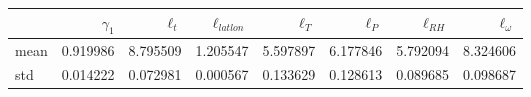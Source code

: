 \begin{tabular}{lrrrrrrr}
\toprule
{} &  $\gamma_1$ &  $\ell_t$ &  $\ell_{latlon}$ &  $\ell_T$ &  $\ell_P$ &  $\ell_{RH}$ &  $\ell_\omega$ \\
\midrule
mean &    0.919986 &  8.795509 &         1.205547 &  5.597897 &  6.177846 &     5.792094 &       8.324606 \\
std  &    0.014222 &  0.072981 &         0.000567 &  0.133629 &  0.128613 &     0.089685 &       0.098687 \\
\bottomrule
\end{tabular}
